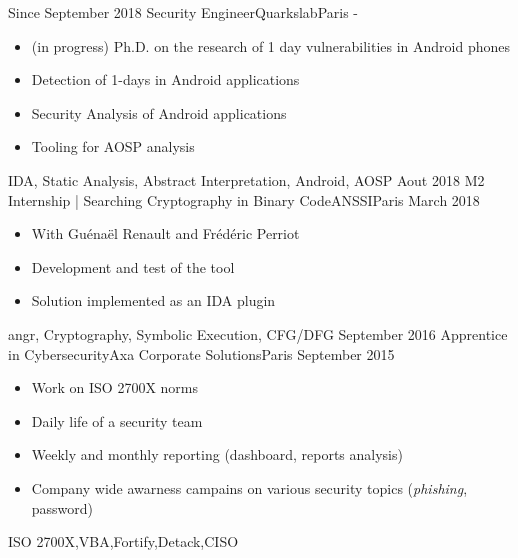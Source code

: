 

\begin{experiences}
  \experience
  {Since September 2018} {Security Engineer}{Quarkslab}{Paris}
  {-}{
    \begin{itemize}[topsep=0pt,itemsep=1ex,partopsep=0ex,parsep=0ex]
      \item (in progress) Ph.D. on the research of 1 day vulnerabilities in Android phones
      \item Detection of 1-days in Android applications
      \item Security Analysis of Android applications
      \item Tooling for AOSP analysis
    \end{itemize}
  }
  { IDA, Static Analysis, Abstract Interpretation, Android, AOSP}
  \emptySeparator
  \experience
    {Aout 2018}   {M2 Internship | Searching Cryptography in Binary Code}{ANSSI}{Paris}
    {March 2018} {
                      \begin{itemize}[topsep=0pt,itemsep=1ex,partopsep=0ex,parsep=0ex]
                        \item With Guénaël Renault and Frédéric Perriot
                        \item Development and test of the tool
                        \item Solution implemented as an IDA plugin
                      \end{itemize}
                    }
                    {angr, Cryptography, Symbolic Execution, CFG/DFG}
  \emptySeparator
  \experience
    {September 2016} {Apprentice in Cybersecurity}{Axa Corporate Solutions}{Paris}
    {September 2015}    {
                      \begin{itemize}[topsep=0pt,itemsep=1ex,partopsep=0ex,parsep=0ex]
                        \item Work on ISO 2700X norms
                        \item Daily life of a security team
                        \item Weekly and monthly reporting (dashboard, reports analysis)
                        \item Company wide awarness campains on various security topics (\emph{phishing}, password)
                      \end{itemize}
                    }
                    {ISO 2700X,VBA,Fortify,Detack,CISO}
\end{experiences}
